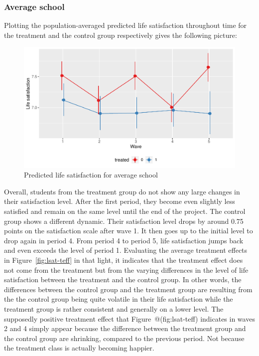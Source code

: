 \documentclass[a4, 12pt]{article}
\begin{document}
\hypertarget{average-school}{%
\subsubsection{Average school}\label{average-school}}

Plotting the population-averaged predicted life satisfaction throughout time for the treatment and the control group respectively gives the following picture:

\begin{figure}[H]

{\centering \includegraphics[width=0.8\linewidth,]{../figures/lsat_pred} 

}

\caption{Predicted life satisfaction for average school}\label{fig:lsat-pred}
\end{figure}

Overall, students from the treatment group do not show any large changes in their satisfaction level. After the first period, they become even slightly less satisfied and remain on the same level until the end of the project. The control group shows a different dynamic. Their satisfaction level drops by around 0.75 points on the satisfaction scale after wave 1. It then goes up to the initial level to drop again in period 4. From period 4 to period 5, life satisfaction jumps back and even exceeds the level of period 1. Evaluating the average treatment effects in Figure~\ref{fig:lsat-teff} in that light, it indicates that the treatment effect does not come from the treatment but from the varying differences in the level of life satisfaction between the treatment and the control group. In other words, the differences between the control group and the treatment group are resulting from the the control group being quite volatile in their life satisfaction while the treatment group is rather consistent and generally on a lower level. The supposedly positive treatment effect that Figure~@(fig:lsat-teff) indicates in waves 2 and 4 simply appear because the difference between the treatment group and the control group are shrinking, compared to the previous period. Not because the treatment class is actually becoming happier.
\end{document}
